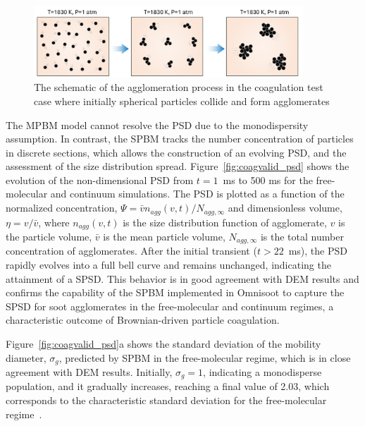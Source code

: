 \begin{figure}[H]
	\centering
	\includegraphics[width=0.9\textwidth]{Figures/Results/Validation/Coagulation/coagulation_scheme.pdf}
	\caption{The schematic of the agglomeration process in the coagulation test case where initially spherical particles collide and form agglomerates}
	\label{fig:coagscheme}
\end{figure}

The MPBM model cannot resolve the PSD due to the monodispersity assumption. In contrast, the SPBM tracks the number concentration of particles in discrete sections, which allows the construction of an evolving PSD, and the assessment of the size distribution spread. Figure~\ref{fig:coagvalid_psd} shows the evolution of the non-dimensional PSD from $t=1$~ms to 500 ms for the free-molecular and continuum simulations. The PSD is plotted as a function of the normalized concentration, ${\Psi= \bar{v}n_{agg}(v,t)/N_{agg,\infty}}$ and dimensionless volume, ${\eta= v/ \bar{v}}$, where ${n_{agg}(v,t)}$ is the size distribution function of agglomerate, ${v}$ is the particle volume, ${\bar{v}}$ is the mean particle volume, ${N_{agg,\infty}}$ is the total number concentration of agglomerates. After the initial transient ($t>22$~ms), the PSD rapidly evolves into a full bell curve and remains unchanged, indicating the attainment of a SPSD. This behavior is in good agreement with DEM results and confirms the capability of the SPBM implemented in Omnisoot to capture the SPSD for soot agglomerates in the free-molecular and continuum regimes, a characteristic outcome of Brownian-driven particle coagulation.


Figure~\ref{fig:coagvalid_psd}a shows the standard deviation of the mobility diameter, ${\sigma_g}$, predicted by SPBM in the free-molecular regime, which is in close agreement with DEM results. Initially, ${\sigma_g}=1$, indicating a monodisperse population, and it gradually increases, reaching a final value of 2.03, which corresponds to the characteristic standard deviation for the free-molecular regime~\citep{vemury1995self}.


